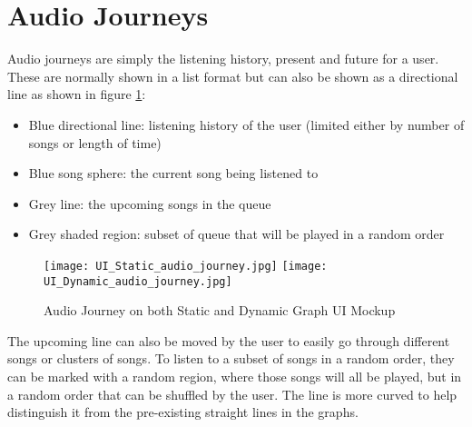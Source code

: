 \section{Audio Journeys}
Audio journeys are simply the listening history, present and future for a user. These are normally shown in a list format but can also be shown as a directional line as shown in figure \ref{figure::ui::audio_journey_as_line}:\begin{itemize}
    \item Blue directional line: listening history of the user (limited either by number of songs or length of time)
    \item Blue song sphere: the current song being listened to
    \item Grey line: the upcoming songs in the queue
    \item Grey shaded region: subset of queue that will be played in a random order
\end{itemize}

\begin{figure}
    \texttt{[image: UI\_Static\_audio\_journey.jpg]}
    \texttt{[image: UI\_Dynamic\_audio\_journey.jpg]}
    \caption{Audio Journey on both Static and Dynamic Graph UI Mockup}
    \label{figure::ui::audio_journey_as_line}
\end{figure}

The upcoming line can also be moved by the user to easily go through different songs or clusters of songs. To listen to a subset of songs in a random order, they can be marked with a random region, where those songs will all be played, but in a random order that can be shuffled by the user. The line is more curved to help distinguish it from the pre-existing straight lines in the graphs.


